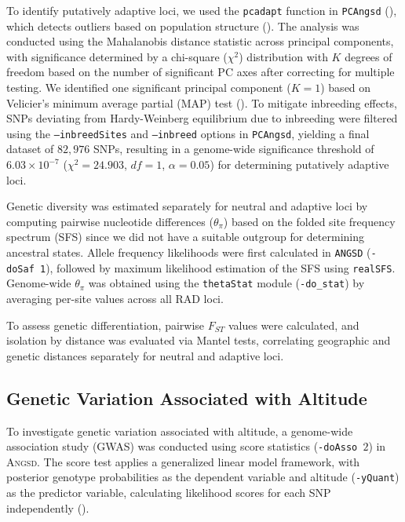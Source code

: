 \documentclass[9pt,a4paper,twoside]{rho-class/rho}
\begin{document}
        To identify putatively adaptive loci, we used the \texttt{pcadapt} function in \texttt{PCAngsd} (\cite{Meisner2018}), which detects outliers based on population structure (\cite{Luu2017}). The analysis was conducted using the Mahalanobis distance statistic across principal components, with significance determined by a chi-square ($\chi^2$) distribution with $K$ degrees of freedom based on the number of significant PC axes after correcting for multiple testing. We identified one significant principal component ($K = 1$) based on Velicier’s minimum average partial (MAP) test (\cite{Shriner2011}). To mitigate inbreeding effects, SNPs deviating from Hardy-Weinberg equilibrium due to inbreeding were filtered using the \texttt{--inbreedSites} and \texttt{--inbreed} options in \texttt{PCAngsd}, yielding a final dataset of $82,976$ SNPs, resulting in a genome-wide significance threshold of $6.03 \times 10^{-7}$ ($\chi^2 = 24.903$, $df = 1$, $\alpha = 0.05$) for determining putatively adaptive loci.

        Genetic diversity was estimated separately for neutral and adaptive loci by computing pairwise nucleotide differences ($\theta_{\pi}$) based on the folded site frequency spectrum (SFS) since we did not have a suitable outgroup for determining ancestral states. Allele frequency likelihoods were first calculated in \texttt{ANGSD} (\texttt{-doSaf 1}), followed by maximum likelihood estimation of the SFS using \texttt{realSFS}. Genome-wide $\theta_{\pi}$ was obtained using the \texttt{thetaStat} module (\texttt{-do\_stat}) by averaging per-site values across all RAD loci.

        To assess genetic differentiation, pairwise $F_{ST}$ values were calculated, and isolation by distance was evaluated via Mantel tests, correlating geographic and genetic distances separately for neutral and adaptive loci.


    \subsection{Genetic Variation Associated with Altitude}
    
        To investigate genetic variation associated with altitude, a genome-wide association study (GWAS) was conducted using score statistics (\texttt{-doAsso $2$}) in \textsc{Angsd}. The score test applies a generalized linear model framework, with posterior genotype probabilities as the dependent variable and altitude (\texttt{-yQuant}) as the predictor variable, calculating likelihood scores for each SNP independently (\cite{Skotte2012}).
\end{document}

